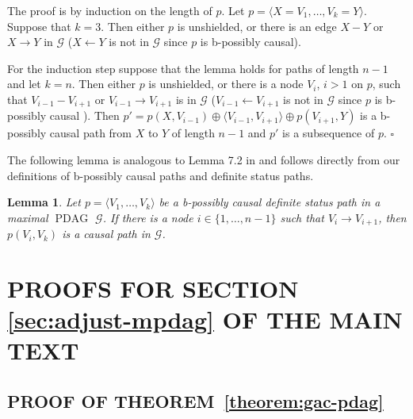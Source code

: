 \documentclass[letterpaper]{article}
\newtheorem{lemma}[theorem]{Lemma}
\theoremstyle{definition}
\newenvironment{proofof}[1][]{\begin{trivlist}
   \item[\hskip \labelsep {\bfseries Proof of #1.}]}{\hfill{}$\square$\end{trivlist}}
\theoremstyle{remark}
\DeclareMathOperator{\PDAG}{PDAG}
\newcommand{\mpdag}{maximal $\PDAG$}
\newcommand{\g}[1][G]{\mathcal{#1}}
\begin{document}
\begin{proofof}[Lemma~\ref{lemma:unshielded-analog}] The proof is by induction on the length of $p$. Let $p=\langle X= V_1, \dots , V_k =Y \rangle$.
Suppose that $k=3$. Then either $p$ is unshielded, or there is an edge  $X - Y$ or $X \rightarrow Y$ in $\g$ ($X \leftarrow Y$ is not in $\g$ since $p$ is b-possibly causal). 

For the induction step suppose that the lemma holds for paths of length $n-1$ and let $k=n$. Then either $p$ is unshielded, or there is a node $V_i$, $i >1$ on $p$, such that $V_{i-1} - V_{i+1}$ or $V_{i-1} \rightarrow V_{i+1}$ is in $\g$ ($V_{i-1} \leftarrow V_{i+1}$ is not in $\g$ since $p$ is b-possibly causal ). Then $p' = p(X,V_{i-1}) \oplus \langle V_{i-1}, V_{i+1} \rangle \oplus p(V_{i+1},Y)$ is a b-possibly causal path from $X$ to $Y$ of length $n-1$ and $p'$ is a subsequence of $p$.  
\end{proofof}
The following lemma is analogous to Lemma 7.2 in \cite{maathuis2013generalized} and follows directly from our definitions of b-possibly causal paths and definite status paths.
\begin{lemma}
 Let $p =\langle V_1, \dots , V_k \rangle$ be a b-possibly causal definite status path in a \mpdag{} $\g$. If there is a node $i \in \{1, \dots, n-1\}$ such that $V_i \rightarrow V_{i+1}$, then $p(V_i, V_k)$ is a causal path in $\g$.
\label{lemma:unshielded-edgeanalog}
\end{lemma}

\section{PROOFS FOR SECTION \ref{sec:adjust-mpdag} OF THE MAIN TEXT} \label{sec:proofadjust-mpdag}

\subsection{PROOF OF THEOREM~\ref{theorem:gac-pdag}}
\end{document}
